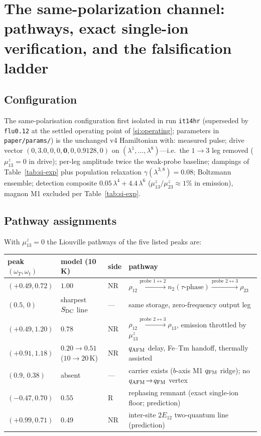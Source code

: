 \documentclass[11pt]{article}
\newcommand{\qafm}{q_{\rm AFM}}
\newcommand{\qfm}{q_{\rm FM}}
\begin{document}
\section{The same-polarization channel: pathways, exact single-ion
verification, and the falsification ladder}
\label{si:samepol}

\subsection{Configuration}
The same-polarisation configuration first isolated in run
\texttt{it14hr} (superseded by \texttt{flu0.12} at the settled operating
point of \cref{si:operating}; parameters in \texttt{paper/params/}) is the unchanged
v4 Hamiltonian with: measured pulse; drive vector
$(0,3.0,0,0,\mathbf{0},0,0.9128,0)$ on
$(\lambda^1,\dots,\lambda^8)$---i.e.\ the $1\!\to\!3$ leg removed
($\mu^z_{13}=0$ in drive); per-leg amplitude twice the weak-probe
baseline; dampings of Table~\ref{tab:si-exp} plus population relaxation
$\gamma(\lambda^{3,8})=0.08$; Boltzmann ensemble; detection composite
$0.05\,\lambda^4+4.4\,\lambda^6$ ($\mu^z_{13}/\mu^z_{23}\approx1\%$ in
emission), magnon M1 excluded per Table~\ref{tab:si-exp}.

\subsection{Pathway assignments}
With $\mu^z_{13}=0$ the Liouville pathways of the five listed peaks are:
\begin{center}\small
\renewcommand{\arraystretch}{1.3}
\begin{tabular}{llll}
\toprule
peak $(\omega_T,\omega_t)$ & model (10\,K) & side & pathway\\
\midrule
$(+0.49,0.72)$ & $1.00$ & NR &
  $\rho_{12}\xrightarrow{\text{probe }1\leftrightarrow2}n_2(\tau\text{-phase})
  \xrightarrow{\text{probe }2\leftrightarrow3}\rho_{23}$\\
$(0.5,\,0)$ & sharpest $S_{\rm DC}$ line & --- &
  same storage, zero-frequency output leg\\
$(+0.49,1.20)$ & $0.78$ & NR &
  $\rho_{12}\xrightarrow{\text{probe }2\leftrightarrow3}\rho_{13}$,
  emission throttled by $\mu^z_{13}$\\
$(+0.91,1.18)$ & $0.20\to0.51$ ($10\to20$\,K) & NR &
  $\qafm$ delay, Fe--Tm handoff, thermally assisted\\
$(0.9,\,0.38)$ & absent & --- & carrier exists ($b$-axis M1 $\qfm$
  ridge); no $\qafm\!\to\!\qfm$ vertex\\
\midrule
$(-0.47,0.70)$ & $0.55$ & R & rephasing remnant (exact single-ion
  floor; prediction)\\
$(+0.99,0.71)$ & $0.49$ & NR & inter-site $2E_{12}$ two-quantum line
  (prediction)\\
\bottomrule
\end{tabular}
\end{center}
\end{document}
